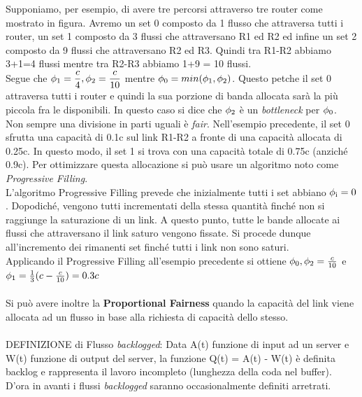 \documentclass{article}
\begin{document}
\noindent Supponiamo, per esempio, di avere tre percorsi attraverso tre router come mostrato in figura. Avremo un set 0 composto da 1 flusso che attraversa tutti i router, un set 1 composto da 3 flussi che attraversano R1 ed R2 ed infine un set 2 composto da 9 flussi che attraversano R2 ed R3. Quindi tra R1-R2 abbiamo 3+1=4 flussi mentre tra R2-R3 abbiamo 1+9 = 10 flussi.\\
Segue che \(\displaystyle \phi\textsubscript{1} = \frac{c}{4}, \phi\textsubscript{2} = \frac{c}{10}\) mentre \(\displaystyle \phi\textsubscript{0} = min(\phi\textsubscript{1}, \phi\textsubscript{2})\). Questo petche il set 0 attraversa tutti i router e quindi la sua porzione di banda allocata sarà la più piccola fra le disponibili. In questo caso si dice che \(\displaystyle \phi\textsubscript{2} \) è un \textit{bottleneck} per \(\displaystyle \phi\textsubscript{0} \).\\
Non sempre una divisione in parti uguali è \textit{fair}. Nell'esempio precedente, il set 0 sfrutta una capacità di 0.1c sul link R1-R2 a fronte di una capacità allocata di 0.25c. In questo modo, il set 1 si trova con una capacità totale di 0.75c (anziché 0.9c). Per ottimizzare questa allocazione si può usare un algoritmo noto come \textit{Progressive Filling}.\\
L'algoritmo Progressive Filling prevede che inizialmente tutti i set abbiano \(\phi\textsubscript{i}=0\). Dopodiché, vengono tutti incrementati della stessa quantità finché non si raggiunge la saturazione di un link. A questo punto, tutte le bande allocate ai flussi che attraversano il link saturo vengono fissate. Si procede dunque all'incremento dei rimanenti set finché tutti i link non sono saturi.\\
Applicando il Progressive Filling all'esempio precedente si ottiene \( \phi\textsubscript{0}, \phi\textsubscript{2} = \frac{c}{10} \) e \( \phi\textsubscript{1} = \frac{1}{3}(c - \frac{c}{10}) = 0.3c\)\\ \\
Si può avere inoltre la \textbf{Proportional Fairness} quando la capacità del link viene allocata ad un flusso in base alla richiesta di capacità dello stesso.\\ \\
DEFINIZIONE di Flusso \textit{backlogged}: Data A(t) funzione di input ad un server e W(t) funzione di output del server, la funzione Q(t) = A(t) - W(t) è definita backlog e rappresenta il lavoro incompleto (lunghezza della coda nel buffer). D'ora in avanti i flussi \textit{backlogged} saranno occasionalmente definiti arretrati.\\ \\
\end{document}
